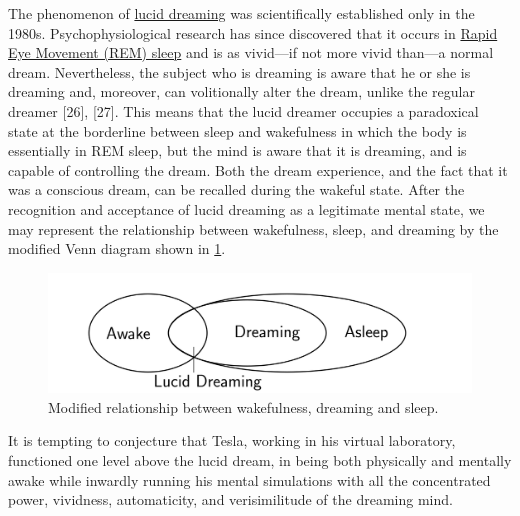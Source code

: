 \documentclass[
  11pt,
  a4paper,
]{article}
\begin{document}
The phenomenon of \href{https://en.wikipedia.org/wiki/Lucid_dream}{lucid
dreaming} was scientifically established only in the 1980s.
Psychophysiological research has since discovered that it occurs in
\href{https://en.wikipedia.org/wiki/Rapid_eye_movement_sleep}{Rapid Eye
Movement (REM) sleep} and is as vivid---if not more vivid than---a
normal dream. Nevertheless, the subject who is dreaming is aware that he
or she is dreaming and, moreover, can volitionally alter the dream,
unlike the regular dreamer {[}26{]}, {[}27{]}. This means that the lucid
dreamer occupies a paradoxical state at the borderline between sleep and
wakefulness in which the body is essentially in REM sleep, but the mind
is aware that it is dreaming, and is capable of controlling the dream.
Both the dream experience, and the fact that it was a conscious dream,
can be recalled during the wakeful state. After the recognition and
acceptance of lucid dreaming as a legitimate mental state, we may
represent the relationship between wakefulness, sleep, and dreaming by
the modified Venn diagram shown in \cref{fig:lucid}.

\begin{figure}
\hypertarget{fig:lucid}{%
\centering
\includegraphics[width=1\textwidth,height=\textheight]{images/lucid.svg}
\caption[Modified relationship between wakefulness, dreaming and
sleep.]{Modified relationship between wakefulness, dreaming and
sleep.\footnotemark{}}\label{fig:lucid}
}
\end{figure}

It is tempting to conjecture that Tesla, working in his virtual
laboratory, functioned one level above the lucid dream, in being both
physically and mentally awake while inwardly running his mental
simulations with all the concentrated power, vividness, automaticity,
and verisimilitude of the dreaming mind.
\end{document}
